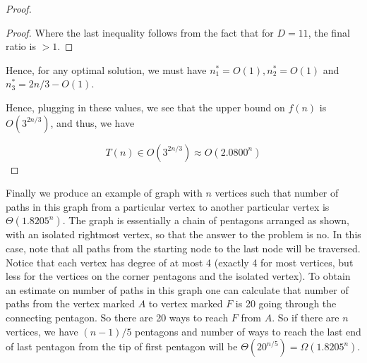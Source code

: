 \documentclass[answers]{exam}
\begin{document}
\begin{questions}
\begin{solution}
\begin{proof}
\begin{proof}
    Where the last inequality follows from the fact that for $D = 11$, the final ratio is $>1$.
\end{proof}

Hence, for any optimal solution, we must have $n_1^* = O(1), n_2^* = O(1)$ and $n_3^* = 2n/3 - O(1)$.

Hence, plugging in these values, we see that the upper bound on $f(n)$ is $O(3^{2n/3})$, and thus, we have

\[
    T(n) \in O(3^{2n/3}) \approx O(2.0800^n)
\]
\end{proof}
Finally we produce an example of graph with $n$ vertices such that number of paths in this graph from a particular vertex to another particular vertex is $\Theta(1.8205^n)$. The graph is essentially a chain of pentagons arranged as shown, with an isolated rightmost vertex, so that the answer to the problem is no. In this case, note that all paths from the starting node to the last node will be traversed. Notice that each vertex has degree of at most 4 (exactly 4 for most vertices, but less for the vertices on the corner pentagons and the isolated vertex). To obtain an estimate on number of paths in this graph one can calculate that number of paths from the vertex marked $A$ to vertex marked $F$ is 20 going through the connecting pentagon. So there are 20 ways to reach $F$ from $A$. So if there are $n$ vertices, we have $(n - 1)/5$ pentagons and number of ways to reach the last end of last pentagon from the tip of first pentagon will be $\Theta(20^{n/5}) = \Omega(1.8205^n)$.

\begin{center}
\end{center}
\end{solution}
\end{questions}
\end{document}
